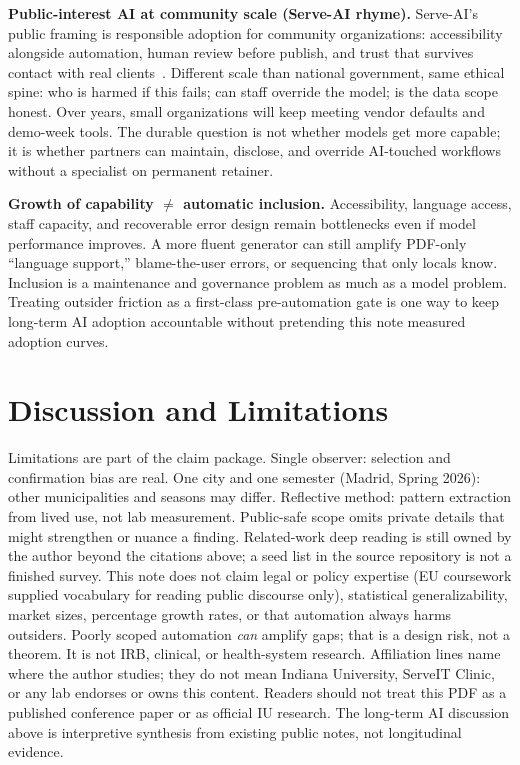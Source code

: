 \documentclass[10pt,twocolumn]{article}
\begin{document}
\textbf{Public-interest AI at community scale (Serve-AI rhyme).} Serve-AI's
public framing is responsible adoption for community organizations:
accessibility alongside automation, human review before publish, and trust that
survives contact with real clients~\cite{serveai}. Different scale than national
government, same ethical spine: who is harmed if this fails; can staff override
the model; is the data scope honest. Over years, small organizations will keep
meeting vendor defaults and demo-week tools. The durable question is not whether
models get more capable; it is whether partners can maintain, disclose, and
override AI-touched workflows without a specialist on permanent retainer.

\textbf{Growth of capability $\neq$ automatic inclusion.} Accessibility,
language access, staff capacity, and recoverable error design remain
bottlenecks even if model performance improves. A more fluent generator can
still amplify PDF-only ``language support,'' blame-the-user errors, or
sequencing that only locals know. Inclusion is a maintenance and governance
problem as much as a model problem. Treating outsider friction as a first-class
pre-automation gate is one way to keep long-term AI adoption accountable without
pretending this note measured adoption curves.

\section{Discussion and Limitations}
Limitations are part of the claim package. Single observer: selection and
confirmation bias are real. One city and one semester (Madrid, Spring 2026):
other municipalities and seasons may differ. Reflective method: pattern
extraction from lived use, not lab measurement. Public-safe scope omits private
details that might strengthen or nuance a finding. Related-work deep reading is
still owned by the author beyond the citations above; a seed list in the source
repository is not a finished survey. This note does not claim legal or policy
expertise (EU coursework supplied vocabulary for reading public discourse only),
statistical generalizability, market sizes, percentage growth rates, or that
automation always harms outsiders. Poorly scoped automation \emph{can} amplify
gaps; that is a design risk, not a theorem. It is not IRB, clinical, or
health-system research. Affiliation lines name where the author studies; they do
not mean Indiana University, ServeIT Clinic, or any lab endorses or owns this
content. Readers should not treat this PDF as a published conference paper or as
official IU research. The long-term AI discussion above is interpretive synthesis
from existing public notes, not longitudinal evidence.
\end{document}
